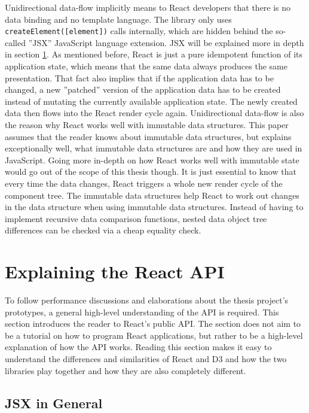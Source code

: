 Unidirectional data-flow implicitly means to React developers that there is no data binding and no template language. The library only uses \texttt{createElement([element])} calls internally, which are hidden behind the so-called ''JSX'' JavaScript language extension. JSX will be explained more in depth in section \ref{sec:reactApi}. As mentioned before, React is just a pure idempotent function of its application state, which means that the same data always produces the same presentation. That fact also implies that if the application data has to be changed, a new ''patched'' version of the application data has to be created instead of mutating the currently available application state. The newly created data then flows into the React render cycle again. Unidirectional data-flow is also the reason why React works well with immutable data structures. This paper assumes that the reader knows about immutable data structures, but \cite{ImmutableJS} explains exceptionally well, what immutable data structures are and how they are used in JavaScript. Going more in-depth on how React works well with immutable state would go out of the scope of this thesis though. It is just essential to know that every time the data changes,  React triggers a whole new render cycle of the component tree. The immutable data structures help React to work out changes in the data structure when using immutable data structures. Instead of having to implement recursive data comparison functions, nested data object tree differences can be checked via a cheap equality check.

\section{Explaining the React API}
\label{sec:reactApi}

To follow performance discussions and elaborations about the thesis project's prototypes, a general high-level understanding of the API is required. This section introduces the reader to React's public API. The section does not aim to be a tutorial on how to program React applications, but rather to be a high-level explanation of how the API works. Reading this section makes it easy to understand the differences and similarities of React and D3 and how the two libraries play together and how they are also completely different.

\subsection{JSX in General}

